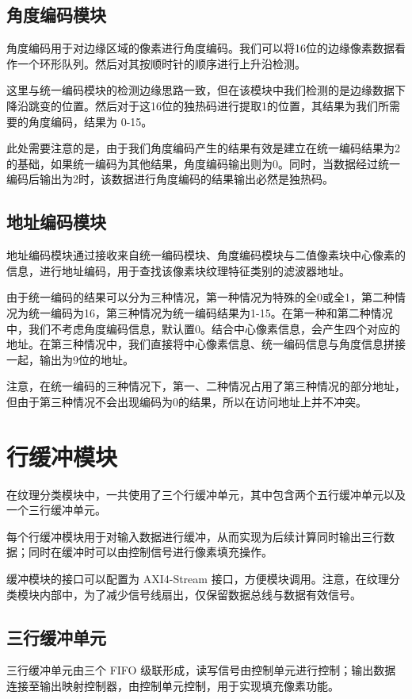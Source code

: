 \documentclass[12pt, a4paper, oneside]{ctexbook}
\begin{document}
	\subsection{角度编码模块}
	角度编码用于对边缘区域的像素进行角度编码。我们可以将16位的边缘像素数据看作一个环形队列。然后对其按顺时针的顺序进行上升沿检测。
	\par 这里与统一编码模块的检测边缘思路一致，但在该模块中我们检测的是边缘数据下降沿跳变的位置。然后对于这16位的独热码进行提取1的位置，其结果为我们所需要的角度编码，结果为 0-15。\par 此处需要注意的是，由于我们角度编码产生的结果有效是建立在统一编码结果为2的基础，如果统一编码为其他结果，角度编码输出则为0。同时，当数据经过统一编码后输出为2时，该数据进行角度编码的结果输出必然是独热码。
	\subsection{地址编码模块}
	地址编码模块通过接收来自统一编码模块、角度编码模块与二值像素块中心像素的信息，进行地址编码，用于查找该像素块纹理特征类别的滤波器地址。\par 由于统一编码的结果可以分为三种情况，第一种情况为特殊的全0或全1，第二种情况为统一编码为16，第三种情况为统一编码结果为1-15。在第一种和第二种情况中，我们不考虑角度编码信息，默认置0。结合中心像素信息，会产生四个对应的地址。在第三种情况中，我们直接将中心像素信息、统一编码信息与角度信息拼接一起，输出为9位的地址。
	\par 注意，在统一编码的三种情况下，第一、二种情况占用了第三种情况的部分地址，但由于第三种情况不会出现编码为0的结果，所以在访问地址上并不冲突。	
	
	\section{行缓冲模块}
	在纹理分类模块中，一共使用了三个行缓冲单元，其中包含两个五行缓冲单元以及一个三行缓冲单元。\par 每个行缓冲模块用于对输入数据进行缓冲，从而实现为后续计算同时输出三行数据；同时在缓冲时可以由控制信号进行像素填充操作。\par 	缓冲模块的接口可以配置为 AXI4-Stream 接口，方便模块调用。注意，在纹理分类模块内部中，为了减少信号线扇出，仅保留数据总线与数据有效信号。
	\subsection{三行缓冲单元}
	三行缓冲单元由三个 FIFO 级联形成，读写信号由控制单元进行控制；输出数据连接至输出映射控制器，由控制单元控制，用于实现填充像素功能。
\end{document}
